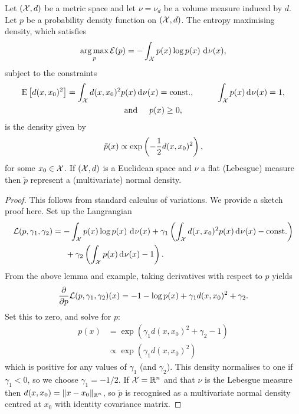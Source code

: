 \documentclass[a4paper,showframe,11pt,draft]{report}
\begin{document}
\begin{lemma}\label{thm:maxentr}
  Let $({\mathcal X},d)$ be a metric space and let $\nu=\nu_d$ be a volume measure induced by $d$.
  Let $p$ be a probability density function on $({\mathcal X},d)$.
  The entropy maximising density, which satisfies
  \[
    \operatorname*{arg\,max}_{p} {\mathcal E}(p) = - \int_{\mathcal X} p(x) \log p(x) \, \operatorname{d\!\:\!}\nu(x),
  \]
  subject to the constraints
  \begin{align*}
    \begin{gathered}
      \operatorname{E}\big[d(x,x_0)^2\big] = \int_{\mathcal X} d(x,x_0)^2 p(x) \operatorname{d\!\:\!}\nu(x) = \text{const.}, \hspace{1cm} 
      \int_{\mathcal X} p(x) \operatorname{d\!\:\!}\nu(x) = 1, \\
      \text{and} \hspace{0.5cm} p(x) \geq 0,
    \end{gathered}
  \end{align*}
  is the density given by
  \[
    \tilde p(x) \propto \exp \left(-\frac{1}{2} d(x,x_0)^2 \right),
  \]
  for some $x_0\in{\mathcal X}$.
  If $({\mathcal X},d)$ is a Euclidean space and $\nu$ a flat (Lebesgue) measure then $\tilde p$ represent a (multivariate) normal density.
\end{lemma}

\begin{proof}
  This follows from standard calculus of variations.
  We provide a sketch proof here.
  Set up the Langrangian
  \begin{align*}
      {\mathcal L}(p,\gamma_1,\gamma_2) &= 
      - \int_{\mathcal X} p(x) \log p(x) \, \operatorname{d\!\:\!}\nu(x) +
      \gamma_1 \left(\int_{\mathcal X} d(x,x_0)^2 p(x) \operatorname{d\!\:\!}\nu(x) - \text{const.} \right) \\
      &\phantom{==} + \gamma_2 \left( \int_{\mathcal X} p(x) \operatorname{d\!\:\!}\nu(x) - 1 \right).
  \end{align*}
  From the above lemma and example, taking derivatives with respect to $p$ yields
  \begin{align*}
    \frac{\partial}{\partial p} {\mathcal L}(p,\gamma_1,\gamma_2)(x)
    = - 1 - \log p(x) + \gamma_1 d(x,x_0)^2 + \gamma_2.
  \end{align*}
  Set this to zero, and solve for $p$:
  \begin{align*}
    p(x) &= \exp \left( \gamma_1 d(x,x_0)^2 + \gamma_2 - 1 \right) \\
    &\propto \exp \left( \gamma_1 d(x,x_0)^2 \right)
  \end{align*}
  which is positive for any values of $\gamma_1$ (and $\gamma_2$).
  This density normalises to one if $\gamma_1 < 0$, so we choose $\gamma_1=-1/2$.
  If ${\mathcal X} = \mathbb{R}^n$ and that $\nu$ is the Lebesgue measure then $d(x,x_0) = \lVert x-x_0\rVert_{\mathbb{R}^n}$, so $\tilde p$ is recognised as a multivariate normal density centred at $x_0$ with identity covariance matrix.
\end{proof}
\end{document}
